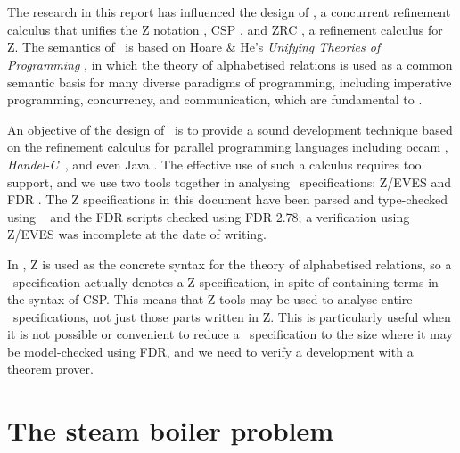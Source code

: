 \documentclass{report}
\newcommand{\HandelC}{\textsf{\slshape Handel-C}}
\begin{document}

\section{\Circus}

The research in this report has influenced the design of \Circus, a
concurrent refinement calculus \cite{woodcock-cavalcanti-01} that
unifies the Z notation \cite{spivey-88, potter-sinclair-till-91,
  spivey-92, woodcock-davies-96}, CSP \cite{hoare-85, roscoe-98}, and
ZRC \cite{cavalcanti-97, cavalcanti-woodcock-98}, a refinement
calculus for Z.  The semantics of \Circus\ is based on Hoare \& He's
\emph{Unifying Theories of Programming} \cite{hoare-he-98}, in which
the theory of alphabetised relations is used as a common semantic
basis for many diverse paradigms of programming, including imperative
programming, concurrency, and communication, which are fundamental to
\Circus.

An objective of the design of \Circus\ is to provide a sound
development technique based on the refinement calculus \cite
{morgan-94} for parallel programming languages including
\textsf{occam} \cite{inmos-84}, \HandelC\
\cite{embedded-solutions-ltd-99}, and even Java
\cite{arnold-gosling-96, cavalcanti-sampaio-01}.  The effective use of
such a calculus requires tool support, and we use two tools together
in analysing \Circus\ specifications: Z/EVES
\cite{meisels-saaltink-97, saaltink-97} and FDR
\cite{formal-systems-97}.  The Z specifications in this document have
been parsed and type-checked using \fuzz\ \cite{spivey-95} and the FDR
scripts checked using FDR 2.78; a verification using Z/EVES was
incomplete at the date of writing.

In \cite{woodcock-cavalcanti-01}, Z is used as the concrete syntax for
the theory of alphabetised relations, so a \Circus\ specification
actually denotes a Z specification, in spite of containing terms in
the syntax of CSP.  This means that Z tools may be used to analyse
entire \Circus\ specifications, not just those parts written in Z.
This is particularly useful when it is not possible or convenient to
reduce a \Circus\ specification to the size where it may be
model-checked using FDR, and we need to verify a development with a
theorem prover.


\section{The steam boiler problem}
\end{document}

